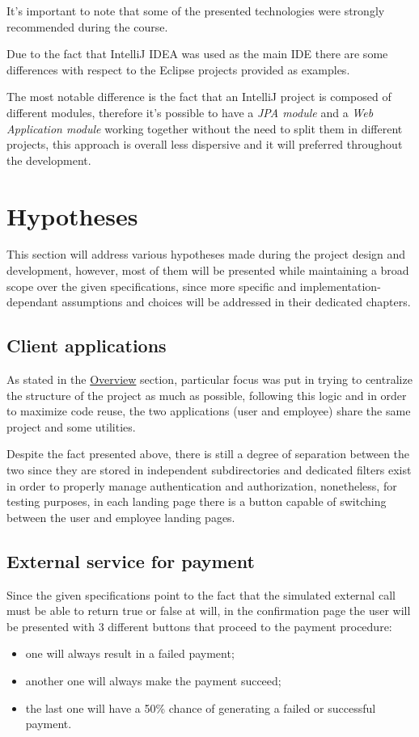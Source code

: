 It's important to note that some of the presented technologies were strongly recommended during the course. 

Due to the fact that IntelliJ IDEA was used as the main IDE there are some differences with respect to the Eclipse projects provided as examples. 

The most notable difference is the fact that an IntelliJ project is composed of different modules, therefore it's possible to have a \textit{JPA module} and a \textit{Web Application module} working together without the need to split them in different projects, this approach is overall less dispersive and it will preferred throughout the development.


\section{Hypotheses}

This section will address various hypotheses made during the project design and development, however, most of them will be presented while maintaining a broad scope over the given specifications, since more specific and implementation-dependant assumptions and choices will be addressed in their dedicated chapters. 

\subsection*{Client applications}

As stated in the \hyperref[sec:overview]{Overview} section, particular focus was put in trying to centralize the structure of the project as much as possible, following this logic and in order to maximize code reuse, the two applications (user and employee) share the same project and some utilities.

Despite the fact presented above, there is still a degree of separation between the two since they are stored in independent subdirectories and dedicated filters exist in order to properly manage authentication and authorization, nonetheless, for testing purposes, in each landing page there is a button capable of switching between the user and employee landing pages.

\subsection*{External service for payment}

Since the given specifications point to the fact that the simulated external call must be able to return true or false at will, in the confirmation page the user will be presented with 3 different buttons that proceed to the payment procedure:
\begin{itemize}
    \item one will always result in a failed payment;
    \item another one will always make the payment succeed;
    \item the last one will have a 50\% chance of generating a failed or successful payment.
\end{itemize}

